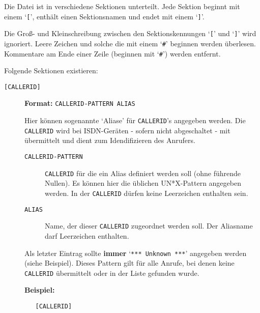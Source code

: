 Die Datei ist in verschiedene Sektionen unterteilt. Jede Sektion beginnt mit
einem `{\tt [}', enth\"{a}lt einen Sektionsnamen und endet mit einem
`{\tt ]}'.

Die Gro{\ss}- und Kleinschreibung zwischen den Sektionskennungen `{\tt [}'
und `{\tt ]}' wird ignoriert. Leere Zeichen und solche die mit einem
`{\tt \#}' beginnen werden \"{u}berlesen. Kommentare am Ende einer Zeile
(beginnen mit `{\tt \#}') werden entfernt.

Folgende Sektionen existieren:

\begin{description}


\item[{\tt [CALLERID]}] \mbox{}



{\bf Format:} {\tt CALLERID-PATTERN ALIAS}

Hier k\"{o}nnen sogenannte `Aliase' f\"{u}r {\tt CALLERID}'s angegeben werden.
Die {\tt CALLERID} wird bei ISDN-Ger\"{a}ten - sofern nicht abgeschaltet -
mit \"{u}bermittelt und dient zum Idendifizieren des Anrufers.

\begin{description}


\item[{\tt CALLERID-PATTERN}] \mbox{}



{\tt CALLERID} f\"{u}r die ein Alias definiert werden soll (ohne
f\"{u}hrende Nullen). Es k\"{o}nnen hier die \"{u}blichen UN*X-Pattern angegeben
werden. In der {\tt CALLERID} d\"{u}rfen keine Leerzeichen enthalten
sein.



\item[{\tt ALIAS}] \mbox{}



Name, der dieser {\tt CALLERID} zugeordnet werden soll. Der
Aliasname darf Leerzeichen enthalten.



\end{description}


Als letzter Eintrag sollte {\bf immer} `{\tt * *** Unknown ***}'
angegeben werden (siehe Beispiel). Dieses Pattern gilt f\"{u}r alle Anrufe,
bei denen keine {\tt CALLERID} \"{u}bermittelt oder in der Liste gefunden
wurde.

{\bf Beispiel:}

\begin{verbatim}
   [CALLERID]


\end{verbatim}
\end{description}
